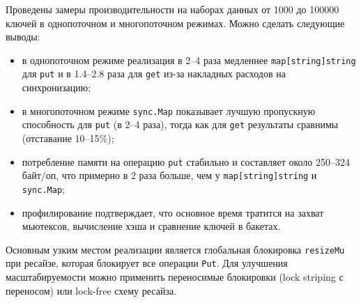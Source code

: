 \documentclass{itmo}
\begin{document}
Проведены замеры производительности на наборах данных от 1000 до 100000 ключей в однопоточном и многопоточном режимах.
Можно сделать следующие выводы:
\begin{itemize}
	\item в однопоточном режиме реализация в 2--4 раза медленнее \texttt{map[string]string} для \texttt{put} и в 1.4--2.8 раза для \texttt{get} из-за накладных расходов на синхронизацию;
	\item в многопоточном режиме \texttt{sync.Map} показывает лучшую пропускную способность для \texttt{put} (в 2--4 раза), тогда как для \texttt{get} результаты сравнимы (отставание 10--15\%);
	\item потребление памяти на операцию \texttt{put} стабильно и составляет около 250--324 байт/оп, что примерно в 2 раза больше, чем у \texttt{map[string]string} и \texttt{sync.Map};
	\item профилирование подтверждает, что основное время тратится на захват мьютексов, вычисление хэша и сравнение ключей в бакетах.
\end{itemize}

Основным узким местом реализации является глобальная блокировка \texttt{resizeMu} при ресайзе, которая блокирует все операции \texttt{Put}.
Для улучшения масштабируемости можно применить переносимые блокировки (lock striping с переносом) или lock-free схему ресайза.
\end{document}
